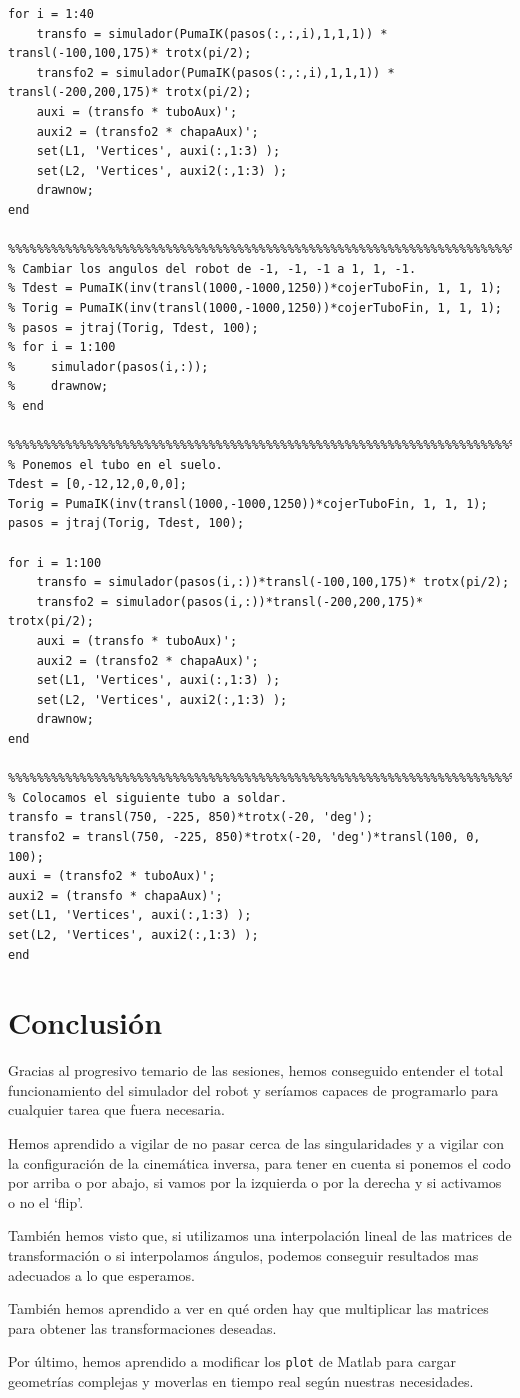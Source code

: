 \documentclass{article}
\let\oldsection\section
\renewcommand\section{\clearpage\oldsection}
\begin{document}
\begin{lstlisting}[frame=single]
for i = 1:40
    transfo = simulador(PumaIK(pasos(:,:,i),1,1,1)) * transl(-100,100,175)* trotx(pi/2);
    transfo2 = simulador(PumaIK(pasos(:,:,i),1,1,1)) * transl(-200,200,175)* trotx(pi/2);
    auxi = (transfo * tuboAux)';
    auxi2 = (transfo2 * chapaAux)';
    set(L1, 'Vertices', auxi(:,1:3) );
    set(L2, 'Vertices', auxi2(:,1:3) );
    drawnow;
end

%%%%%%%%%%%%%%%%%%%%%%%%%%%%%%%%%%%%%%%%%%%%%%%%%%%%%%%%%%%%%%%%%%%%%%%%%%%
% Cambiar los angulos del robot de -1, -1, -1 a 1, 1, -1.
% Tdest = PumaIK(inv(transl(1000,-1000,1250))*cojerTuboFin, 1, 1, 1);
% Torig = PumaIK(inv(transl(1000,-1000,1250))*cojerTuboFin, 1, 1, 1);
% pasos = jtraj(Torig, Tdest, 100);
% for i = 1:100
%     simulador(pasos(i,:));
%     drawnow;
% end

%%%%%%%%%%%%%%%%%%%%%%%%%%%%%%%%%%%%%%%%%%%%%%%%%%%%%%%%%%%%%%%%%%%%%%%%%%%
% Ponemos el tubo en el suelo.
Tdest = [0,-12,12,0,0,0];
Torig = PumaIK(inv(transl(1000,-1000,1250))*cojerTuboFin, 1, 1, 1);
pasos = jtraj(Torig, Tdest, 100);

for i = 1:100
    transfo = simulador(pasos(i,:))*transl(-100,100,175)* trotx(pi/2);
    transfo2 = simulador(pasos(i,:))*transl(-200,200,175)* trotx(pi/2);
    auxi = (transfo * tuboAux)';
    auxi2 = (transfo2 * chapaAux)';
    set(L1, 'Vertices', auxi(:,1:3) );
    set(L2, 'Vertices', auxi2(:,1:3) );
    drawnow;
end

%%%%%%%%%%%%%%%%%%%%%%%%%%%%%%%%%%%%%%%%%%%%%%%%%%%%%%%%%%%%%%%%%%%%%%%%%%%
% Colocamos el siguiente tubo a soldar.
transfo = transl(750, -225, 850)*trotx(-20, 'deg');
transfo2 = transl(750, -225, 850)*trotx(-20, 'deg')*transl(100, 0, 100);
auxi = (transfo2 * tuboAux)';
auxi2 = (transfo * chapaAux)';
set(L1, 'Vertices', auxi(:,1:3) );
set(L2, 'Vertices', auxi2(:,1:3) );
end

\end{lstlisting}

\section{Conclusión}

Gracias al progresivo temario de las sesiones, hemos conseguido entender el total funcionamiento del simulador del robot y seríamos capaces de programarlo para cualquier tarea que fuera necesaria.

Hemos aprendido a vigilar de no pasar cerca de las singularidades y a vigilar con la configuración de la cinemática inversa, para tener en cuenta si ponemos el codo por arriba o por abajo, si vamos por la izquierda o por la derecha y si activamos o no el ‘flip’.

También hemos visto que, si utilizamos una interpolación lineal de las matrices de transformación o si interpolamos ángulos, podemos conseguir resultados mas adecuados a lo que esperamos.

También hemos aprendido a ver en qué orden hay que multiplicar las matrices para obtener las transformaciones deseadas.

Por último, hemos aprendido a modificar los {\tt plot} de Matlab para cargar geometrías complejas y moverlas en tiempo real según nuestras necesidades.
\end{document}
